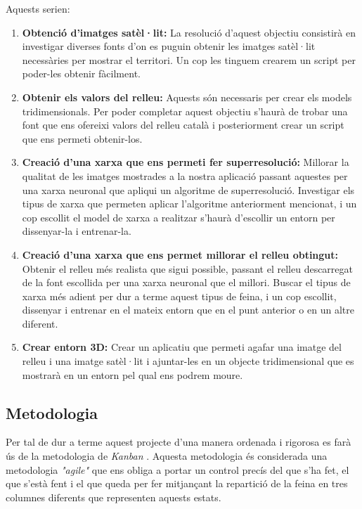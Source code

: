 ﻿\documentclass[10pt,a4paper,twocolumn,twoside]{article}
\begin{document}
Aquests serien:
\begin{enumerate}
\item \textbf{Obtenció d'imatges satèl·lit: }La resolució d'aquest objectiu consistirà en investigar diverses fonts d'on es puguin obtenir les imatges satèl·lit necessàries per mostrar el territori. Un cop les tinguem crearem un script per poder-les obtenir fàcilment.

\item \textbf{Obtenir els valors del relleu: }Aquests són necessaris per crear els models tridimensionals. Per poder completar aquest objectiu s'haurà de trobar una font que ens ofereixi valors del relleu català i posteriorment crear un script que ens permeti obtenir-los.

\item \textbf{Creació d'una xarxa que ens permeti fer superresolució: }Millorar la qualitat de les imatges mostrades a la nostra aplicació passant aquestes per una xarxa neuronal que apliqui un algoritme de superresolució. Investigar els tipus de xarxa que permeten aplicar l'algoritme anteriorment mencionat, i un cop escollit el model de xarxa a realitzar s'haurà d'escollir un entorn per dissenyar-la i entrenar-la.

\item \textbf{Creació d'una xarxa que ens permet millorar el relleu obtingut: }Obtenir el relleu més realista que sigui possible, passant el relleu descarregat de la font escollida per una xarxa neuronal que el millori. Buscar el tipus de xarxa més adient per dur a terme aquest tipus de feina, i un cop escollit, dissenyar i entrenar en el mateix entorn que en el punt anterior o en un altre diferent.

\item \textbf{Crear entorn 3D: }Crear un aplicatiu que permeti agafar una imatge del relleu i una imatge satèl·lit i ajuntar-les en un objecte tridimensional que es mostrarà en un entorn pel qual ens podrem moure.
\end{enumerate}


\subsection{Metodologia}
Per tal de dur a terme aquest projecte d'una manera ordenada i rigorosa es farà ús de la metodologia de \textit{Kanban} \cite{kanban}.
Aquesta metodologia és considerada una metodologia \textit{"agile"} que ens obliga a portar un control precís del que s'ha fet, el que s'està fent i el que queda per fer mitjançant la repartició de la feina en tres columnes diferents que representen aquests estats.\\
\end{document}
